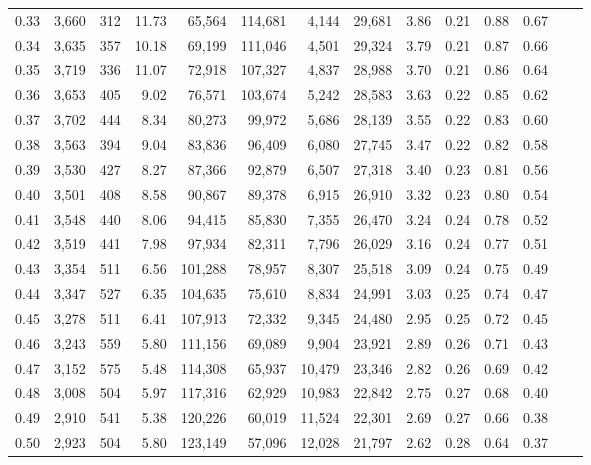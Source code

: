 \begin{tabular}{rrrrrrrrrrrrrr}
0.33 &  3,660 &  312 &   11.73 &   65,564 &  114,681 &   4,144 &  29,681 &  3.86 &  0.21 &  0.88 &      0.67 \\
0.34 &  3,635 &  357 &   10.18 &   69,199 &  111,046 &   4,501 &  29,324 &  3.79 &  0.21 &  0.87 &      0.66 \\
0.35 &  3,719 &  336 &   11.07 &   72,918 &  107,327 &   4,837 &  28,988 &  3.70 &  0.21 &  0.86 &      0.64 \\
0.36 &  3,653 &  405 &    9.02 &   76,571 &  103,674 &   5,242 &  28,583 &  3.63 &  0.22 &  0.85 &      0.62 \\
0.37 &  3,702 &  444 &    8.34 &   80,273 &   99,972 &   5,686 &  28,139 &  3.55 &  0.22 &  0.83 &      0.60 \\
0.38 &  3,563 &  394 &    9.04 &   83,836 &   96,409 &   6,080 &  27,745 &  3.47 &  0.22 &  0.82 &      0.58 \\
0.39 &  3,530 &  427 &    8.27 &   87,366 &   92,879 &   6,507 &  27,318 &  3.40 &  0.23 &  0.81 &      0.56 \\
0.40 &  3,501 &  408 &    8.58 &   90,867 &   89,378 &   6,915 &  26,910 &  3.32 &  0.23 &  0.80 &      0.54 \\
0.41 &  3,548 &  440 &    8.06 &   94,415 &   85,830 &   7,355 &  26,470 &  3.24 &  0.24 &  0.78 &      0.52 \\
0.42 &  3,519 &  441 &    7.98 &   97,934 &   82,311 &   7,796 &  26,029 &  3.16 &  0.24 &  0.77 &      0.51 \\
0.43 &  3,354 &  511 &    6.56 &  101,288 &   78,957 &   8,307 &  25,518 &  3.09 &  0.24 &  0.75 &      0.49 \\
0.44 &  3,347 &  527 &    6.35 &  104,635 &   75,610 &   8,834 &  24,991 &  3.03 &  0.25 &  0.74 &      0.47 \\
0.45 &  3,278 &  511 &    6.41 &  107,913 &   72,332 &   9,345 &  24,480 &  2.95 &  0.25 &  0.72 &      0.45 \\
0.46 &  3,243 &  559 &    5.80 &  111,156 &   69,089 &   9,904 &  23,921 &  2.89 &  0.26 &  0.71 &      0.43 \\
0.47 &  3,152 &  575 &    5.48 &  114,308 &   65,937 &  10,479 &  23,346 &  2.82 &  0.26 &  0.69 &      0.42 \\
0.48 &  3,008 &  504 &    5.97 &  117,316 &   62,929 &  10,983 &  22,842 &  2.75 &  0.27 &  0.68 &      0.40 \\
0.49 &  2,910 &  541 &    5.38 &  120,226 &   60,019 &  11,524 &  22,301 &  2.69 &  0.27 &  0.66 &      0.38 \\
0.50 &  2,923 &  504 &    5.80 &  123,149 &   57,096 &  12,028 &  21,797 &  2.62 &  0.28 &  0.64 &      0.37 \\

\end{tabular}
